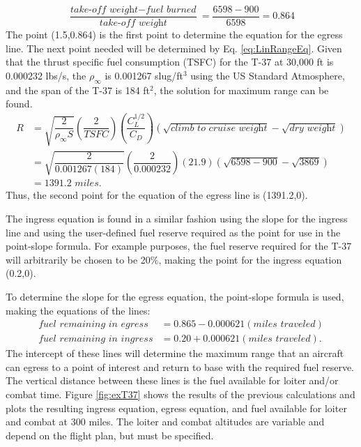 \begin{equation*}
    \dfrac{\textit{take-off weight}- \textit{fuel burned}}{\textit{take-off weight}} = \dfrac{6598-900}{6598} = 0.864
\end{equation*}
The point (1.5,0.864) is the first point to determine the equation for the egress line. The next point needed will be determined by Eq. \ref{eq:LinRangeEq}. Given that the thrust specific fuel consumption (TSFC) for the T-37 at 30,000 ft is 0.000232 lbs/s, the $\rho_\infty$ is 0.001267 slug/ft$^3$ using the US Standard Atmosphere, and the span of the T-37 is 184 ft$^2$, the solution for maximum range can be found.
\begin{align*}
    R  &= \sqrt{\dfrac{2}{\rho_{\infty}S}}\left(\dfrac{2}{TSFC}\right)\left(\dfrac{C_L^{1/2}}{C_D}\right)(\sqrt{\textit{climb to cruise weight}}-\sqrt{\textit{dry weight}})\\
    &= \sqrt{\dfrac{2}{0.001267(184)}}\left(\dfrac{2}{0.000232}\right)\left(21.9\right)(\sqrt{6598-900}-\sqrt{3869})\\
    &=1391.2\textit{ miles}.
\end{align*}
Thus, the second point for the equation of the egress line is (1391.2,0).\par
The ingress equation is found in a similar fashion using the slope for the ingress line and using the user-defined fuel reserve required as the point for use in the point-slope formula. For example purposes, the fuel reserve required  for the T-37 will arbitrarily be chosen to be 20\%, making the point for the ingress equation (0.2,0).\par
To determine the slope for the egress equation, the point-slope formula is used, making the equations of the lines:
\begin{align}
    \textit{fuel remaining in egress} &= 0.865 - 0.000621(\textit{miles traveled})\\
    \textit{fuel remaining in ingress} &= 0.20 + 0.000621(\textit{miles traveled}).
\end{align}
The intercept of these lines will determine the maximum range that an aircraft can egress to a point of interest and return to base with the required fuel reserve. The vertical distance between these lines is the fuel available for loiter and/or combat time. Figure \ref{fig:exT37} shows the results of the previous calculations and plots the resulting ingress equation, egress equation, and fuel available for loiter and combat at 300 miles. The loiter and combat altitudes are variable and depend on the flight plan, but must be specified.\par
